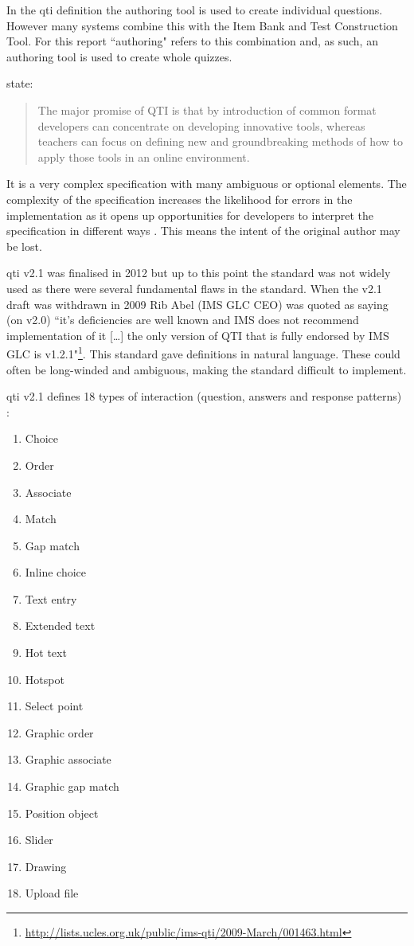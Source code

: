 In the \gls{qti} definition the authoring tool is used to create individual questions. However many systems combine this with the Item Bank and Test Construction Tool. For this report ``\gls{authoring}" refers to this combination and, as such, an authoring tool is used to create whole quizzes.

\cite{wikieassessment} state:
\begin{quote}
The major promise of QTI is that by introduction of common format developers can concentrate on developing innovative tools, whereas teachers can focus on defining new and groundbreaking methods of how to apply those tools in an online environment.
\end{quote}

It is a very complex specification with many ambiguous or optional elements. The complexity of the specification increases the likelihood for errors in the implementation as it opens up opportunities for developers to interpret the specification in different ways \citep{failQTI}. This means the intent of the original author may be lost.

\gls{qti} v2.1 was finalised in 2012 \citep{qtiOverview} but up to this point the standard was not widely used \citep{eps265979} as there were several fundamental flaws in the standard. When the v2.1 draft was withdrawn in 2009 Rib Abel (IMS GLC CEO) was quoted as saying (on v2.0) ``it’s deficiencies are well known and IMS does not recommend implementation of it [\dots] the only version of QTI that is fully endorsed by IMS GLC is v1.2.1"\footnote{\url{http://lists.ucles.org.uk/public/ims-qti/2009-March/001463.html}}. This standard gave definitions in natural language. These could often be long-winded and ambiguous, making the standard difficult to implement\citep{failQTI, Sclater2007}.

\gls{qti} v2.1 defines 18 types of interaction (question, answers and response patterns) \citep{qtiImplementation}:
\begin{multicols}{3}
\begin{enumerate}
\item Choice
\item Order
\item Associate
\item Match
\item Gap match
\item Inline choice
\item Text entry
\item Extended text
\item Hot text
\item Hotspot
\item Select point
\item Graphic order
\item Graphic associate
\item Graphic gap match
\item Position object
\item Slider
\item Drawing
\item Upload file
\end{enumerate}
\end{multicols}

